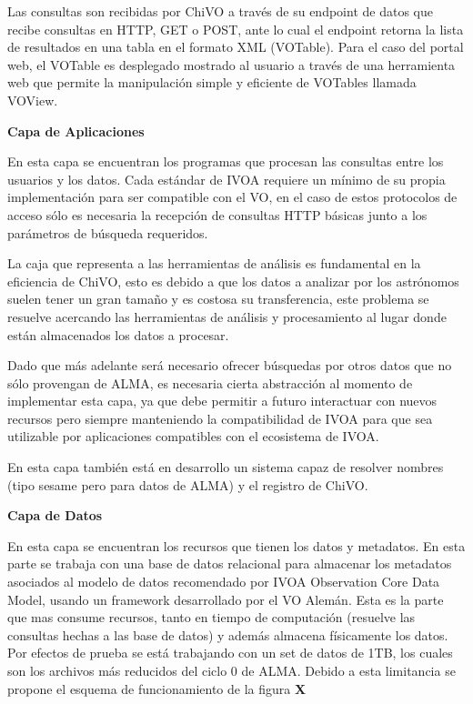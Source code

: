 Las consultas son recibidas por ChiVO a través de su endpoint de datos que recibe
consultas en HTTP, GET o POST, ante lo cual el endpoint retorna la lista de
resultados en una tabla en el formato XML (VOTable).
Para el caso del portal web, el VOTable es desplegado mostrado al usuario a través
de una herramienta web que permite la manipulación simple y eficiente de VOTables
llamada VOView.

\textbf{Capa de Aplicaciones}

En esta capa se encuentran los programas que procesan las consultas entre los
usuarios y los datos.
Cada estándar de IVOA requiere un mínimo de su propia implementación para ser
compatible con el VO, en el caso de estos protocolos de acceso sólo es necesaria la
recepción de consultas HTTP básicas junto a los parámetros de búsqueda requeridos.

La caja que representa a las herramientas de análisis es fundamental en la
eficiencia de ChiVO, esto es debido a que los datos a analizar por los astrónomos
suelen tener un gran tamaño y es costosa su transferencia, este problema se
resuelve acercando las herramientas de análisis y procesamiento al lugar donde están
almacenados los datos a procesar.

Dado que más adelante será necesario ofrecer búsquedas por otros datos que no sólo
provengan de ALMA, es necesaria cierta abstracción al momento de implementar esta
capa, ya que debe permitir a futuro interactuar con nuevos recursos pero siempre
manteniendo la compatibilidad de IVOA para que sea utilizable por aplicaciones
compatibles con el ecosistema de IVOA.

En esta capa también está en desarrollo un sistema capaz de resolver nombres
(tipo sesame pero para datos de ALMA) y el registro de ChiVO.

\textbf{Capa de Datos}

En esta capa se encuentran los recursos que tienen los datos y metadatos.
En esta parte se trabaja con una base de datos relacional para almacenar los
metadatos asociados al modelo de datos recomendado por IVOA Observation Core Data
Model, usando un framework desarrollado por el VO Alemán.
Esta es la parte que mas consume recursos, tanto en tiempo de computación (resuelve
las consultas hechas a las base de datos) y además almacena físicamente los datos.
Por efectos de prueba se está trabajando con un set de datos de 1TB, los cuales son
los archivos más reducidos del ciclo 0 de ALMA. Debido a esta limitancia se propone
el esquema de funcionamiento de la figura \textbf{X}

